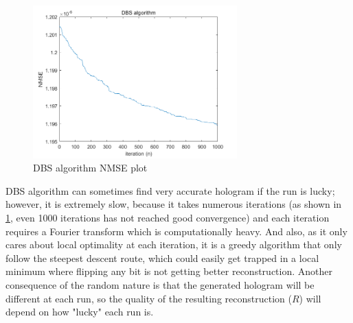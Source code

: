 \begin{figure}[H]
  \centering
  \includegraphics[width=0.7\textwidth]{DBS_NMSE_plot.png}
  \caption{DBS algorithm NMSE plot}
  \label{fig:DBS_NMSE_plot}
\end{figure}
DBS algorithm can sometimes find very accurate hologram if the run is lucky; however, it is extremely slow, because it takes numerous iterations (as shown in \cref{fig:DBS_NMSE_plot}, even 1000 iterations has not reached good convergence) and each iteration requires a Fourier transform which is computationally heavy. And also, as it only cares about local optimality at each iteration, it is a greedy algorithm that only follow the steepest descent route, which could easily get trapped in a local minimum where flipping any bit is not getting better reconstruction. Another consequence of the random nature is that the generated hologram will be different at each run, so the quality of the resulting reconstruction ($R$) will depend on how "lucky" each run is.


